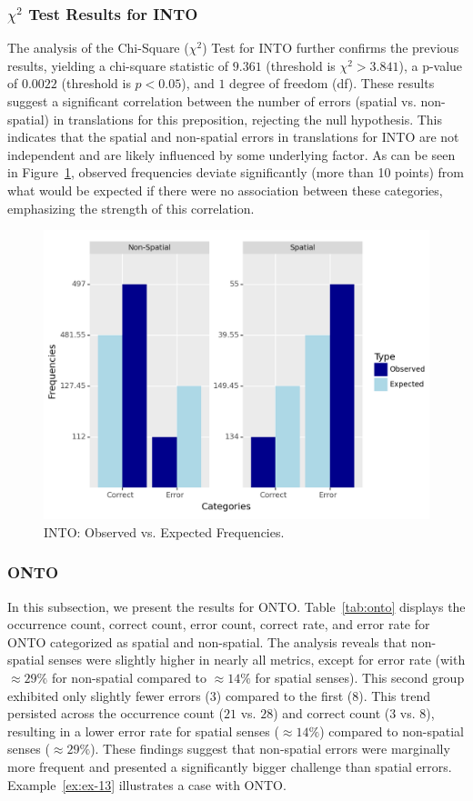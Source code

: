 \subsubsection{$\chi^2$ Test Results for INTO} 

The analysis of the Chi-Square ($\chi^2$) Test for INTO further confirms the previous results, yielding a chi-square statistic of $9.361$ (threshold is  $\chi^2 > 3.841$), a p-value of $0.0022$ (threshold is $p < 0.05$), and $1$ degree of freedom (df). These results suggest a significant correlation between the number of errors (spatial vs. non-spatial) in translations for this preposition, rejecting the null hypothesis. This indicates that the spatial and non-spatial errors in translations for INTO are not independent and are likely influenced by some underlying factor. As can be seen in Figure~\ref{fig: schi-into}, observed frequencies deviate significantly (more than 10 points) from what would be expected if there were no association between these categories, emphasizing the strength of this correlation.

\begin{figure}[htb]
        \centering
        \includegraphics[width=.8\textwidth]{textual/Figuras/Results/Unknown-66.png}
        \caption{INTO: Observed vs. Expected Frequencies.}
        \label{fig: schi-into}
\end{figure}


\subsubsection{ONTO}

In this subsection, we present the results for ONTO. Table~\ref{tab:onto} displays the occurrence count, correct count, error count, correct rate, and error rate for ONTO categorized as spatial and non-spatial. The analysis reveals that non-spatial senses were slightly higher in nearly all metrics, except for error rate (with $\approx29\%$ for non-spatial compared to $\approx14\%$ for spatial senses). This second group exhibited only slightly fewer errors ($3$) compared to the first ($8$). This trend persisted across the occurrence count ($21$ vs. $28$) and correct count ($3$ vs. $8$), resulting in a lower error rate for spatial senses ($\approx14\%$) compared to non-spatial senses ($\approx29\%$). These findings suggest that non-spatial errors were marginally more frequent and presented a significantly bigger challenge than spatial errors. Example~\ref{ex:ex-13} illustrates a case with ONTO.

